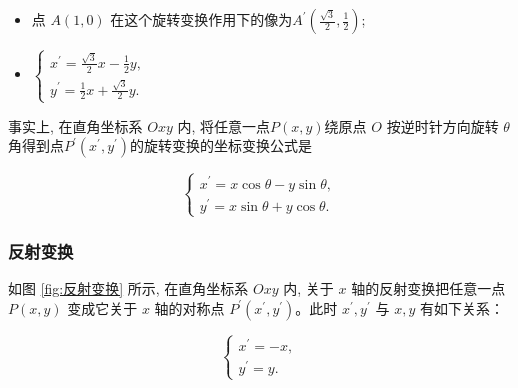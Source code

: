 \begin{solution}
\begin{itemize}
    \item 点 $A(1,0)$ 在这个旋转变换作用下的像为$A^{\prime}\left(\frac{\sqrt{3}}{2}, \frac{1}{2}\right)$;
    \item $\left\{\begin{array}{l}x^{\prime}=\frac{\sqrt{3}}{2} x-\frac{1}{2} y, \\ y^{\prime}=\frac{1}{2} x+\frac{\sqrt{3}}{2} y .\end{array}\right.$
\end{itemize}
\end{solution}

\vspace{0.5cm}

事实上, 在直角坐标系 $O x y$ 内, 将任意一点$P(x, y)$绕原点 $O$ 按逆时针方向旋转 $\theta$ 角得到点$P^{\prime}(x^{\prime}, y^{\prime})$的旋转变换的坐标变换公式是

\begin{equation}
\left\{\begin{array}{l}
x^{\prime}=x \cos \theta-y \sin \theta, \\
y^{\prime}=x \sin \theta+y \cos \theta .
\end{array}\right.\label{eq:旋转变换的坐标变换公式}
\end{equation}

\subsubsection{反射变换}
\label{subsubsec:反射变换}

如图 \ref{fig:反射变换} 所示, 在直角坐标系 $O x y$ 内, 关于 $x$ 轴的反射变换把任意一点 $P(x, y)$ 变成它关于 $x$ 轴的对称点 $P^{\prime}\left(x^{\prime}, y^{\prime}\right)$。此时 $x^{\prime}, y^{\prime}$ 与 $x, y$ 有如下关系：

\begin{equation}
\left\{\begin{array}{l}
x^{\prime}=-x, \\
y^{\prime}=y .
\end{array}\right.
\label{eq:反射变换的表达式}
\end{equation}

